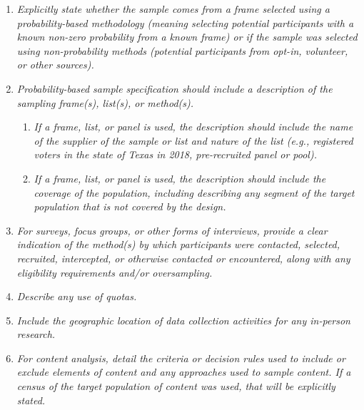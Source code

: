 \documentclass{article}
\begin{document}
\begin{enumerate}

    \item \textit{Explicitly state whether the sample comes from a frame selected
              using a probability-based methodology (meaning selecting potential participants
              with a known non-zero probability from a known frame) or if the sample was
              selected using non-probability methods (potential participants from opt-in,
              volunteer, or other sources).}

    \item \textit{Probability-based sample specification should include a
              description of the sampling frame(s), list(s), or method(s).}

          \begin{enumerate}
              \item \textit{If a frame, list, or panel is used, the description should
                        include the name of the supplier of the sample or list and nature of the list
                        (e.g., registered voters in the state of Texas in 2018, pre-recruited panel or
                        pool).}
              \item \textit{If a frame, list, or panel is used, the description should
                        include the coverage of the population, including describing any segment of the
                        target population that is not covered by the design.}
          \end{enumerate}

    \item \textit{For surveys, focus groups, or other forms of interviews, provide
              a clear indication of the method(s) by which participants were contacted,
              selected, recruited, intercepted, or otherwise contacted or encountered, along
              with any eligibility requirements and/or oversampling.}

    \item \textit{Describe any use of quotas.}

    \item \textit{Include the geographic location of data collection activities for
              any in-person research.}

    \item \textit{For content analysis, detail the criteria or decision rules used
              to include or exclude elements of content and any approaches used to sample
              content. If a census of the target population of content was used, that will be
              explicitly stated.}

\end{enumerate}
\end{document}
